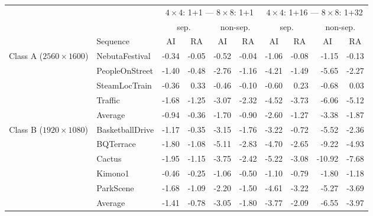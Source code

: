\documentclass[11pt,a4paper,openright,twoside]{book}
\numberwithin{equation}{section} %
\numberwithin{figure}{section} %
\numberwithin{table}{section} %
\begin{document}
\begin{table}[tb]
	\centering
	\small
	\begin{tabularx}{\textwidth}{c|X|rr|rr|rr|rr}
		\multicolumn{2}{c}{} &
		\multicolumn{4}{c|}{$4\times4$: 1+1 --- $8\times8$: 1+1} &
		\multicolumn{4}{c}{$4\times4$: 1+16 --- $8\times8$: 1+32} \\
		\cline{3-10}
		\multicolumn{2}{c}{} &
		\multicolumn{2}{c|}{sep.} &
		\multicolumn{2}{c|}{non-sep.} &
		\multicolumn{2}{c|}{sep.} &
		\multicolumn{2}{c}{non-sep.} \\
		\cline{2-10}
		\multicolumn{1}{c}{} & {Sequence} &
		\multicolumn{1}{c}{ \acs{AI}} & \multicolumn{1}{c|}{ \acs{RA}} &
		\multicolumn{1}{c}{ \acs{AI}} & \multicolumn{1}{c|}{ \acs{RA}} &
		\multicolumn{1}{c}{ \acs{AI}} & \multicolumn{1}{c|}{ \acs{RA}} &
		\multicolumn{1}{c}{ \acs{AI}} & \multicolumn{1}{c}{ \acs{RA}} \\
		\hline
		\hline
		\multirow{5}{2cm}{\centering Class A \scriptsize($2560\times1600$)}
		& NebutaFestival         & -0.34 & -0.05 &  -0.52 & -0.04 & -1.06 & -0.08 & -1.15  &  -0.13 \\
		& PeopleOnStreet         & -1.40 & -0.48 &  -2.76 & -1.16 & -4.21 & -1.49 & -5.65  &  -2.27 \\
		& SteamLocTrain          & -0.36 &  0.33 &  -0.46 & -0.10 & -0.60 &  0.23 & -0.68  &   0.03 \\
		& Traffic                & -1.68 & -1.25 &  -3.07 & -2.32 & -4.52 & -3.73 & -6.06  &  -5.12 \\
		\cline{2-10} &
		Average                  & -0.94 & -0.36 &  -1.70 & -0.90 & -2.60 & -1.27 & -3.38  &  -1.87 \\
		\hline
		\hline
		\multirow{6}{2cm}{\centering Class B \scriptsize($1920\times1080$)}
		& BasketballDrive        & -1.17 & -0.35 &  -3.15 & -1.76 & -3.22 & -0.72 & -5.52  &  -2.36 \\
		& BQTerrace              & -1.80 & -1.08 &  -5.11 & -2.83 & -4.70 & -2.65 & -9.22  &  -4.93 \\
		& Cactus                 & -1.95 & -1.15 &  -3.75 & -2.42 & -5.22 & -3.08 & -10.92 &  -7.68 \\
		& Kimono1                & -0.46 & -0.25 &  -1.06 & -0.50 & -1.10 & -0.79 & -1.80  &  -1.18 \\
		& ParkScene              & -1.68 & -1.09 &  -2.20 & -1.50 & -4.61 & -3.22 & -5.27  &  -3.69 \\
		\cline{2-10} &
		Average                  & -1.41 & -0.78 &  -3.05 & -1.80 & -3.77 & -2.09 & -6.55  &  -3.97 \\

\end{tabularx}
\end{table}
\end{document}
